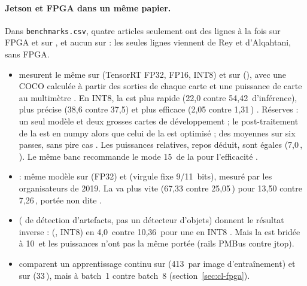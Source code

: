 \paragraph{Jetson et FPGA dans un même papier.} Dans \texttt{benchmarks.csv}, quatre
articles seulement ont des lignes à la fois sur FPGA et sur , et aucun sur  : les
seules lignes  viennent de Rey et d'Alqahtani, sans FPGA.
\begin{itemize}
  \item \citet{arxiv-2304.11580-framework-benchmarking-real-time-embedded} mesurent le même
     sur  (TensorRT FP32, FP16, INT8) et sur  (), avec une
     COCO calculée à partir des sorties de chaque carte et une puissance de carte au
    multimètre . En INT8, la  est plus rapide (22,0 contre 54,42\,
    d'inférence), plus précise (38,6 contre 37,5) et plus efficace (2,05 contre
    1,31\,) . Réserves : un seul modèle et deux grosses cartes de
    développement ; le post-traitement de la  est en numpy alors que celui de la 
    est optimisé  ; des moyennes sur six passes, sans pire cas . Les puissances relatives, repos déduit, sont
    égales (7,0\,, ). Le même banc recommande le mode 15\, de la 
    pour l'efficacité .
  \item {} \citep{arxiv-1909.09709-skynet-hardware-efficient-method-object}\pp{} :
    même modèle sur  (FP32) et  (virgule fixe 9/11~bits), mesuré par les
    organisateurs de  2019. La  va plus vite (67,33 contre 25,05\,) pour
    13,50 contre 7,26\,, portée non dite .
  \item \citet{arxiv-2407.17647-energy-efficient-artefact-detection-accelerator}
    ( de détection d'artefacts, pas un détecteur d'objets) donnent le résultat
    inverse :  (, INT8) en 4,0\, contre 10,36\, pour une  en INT8
    . Mais la  est bridée à 10\, et les puissances n'ont pas
    la même portée (rails PMBus contre jtop).
  \item \citet{2024-aggarwal-chameleon-dual-memory-replay-online} comparent un
    apprentissage continu sur  (413\, par image d'entraînement) et sur 
    (33\,), mais à batch~1 contre batch~8  (section~\ref{sec:cl-fpga}).
\end{itemize}

